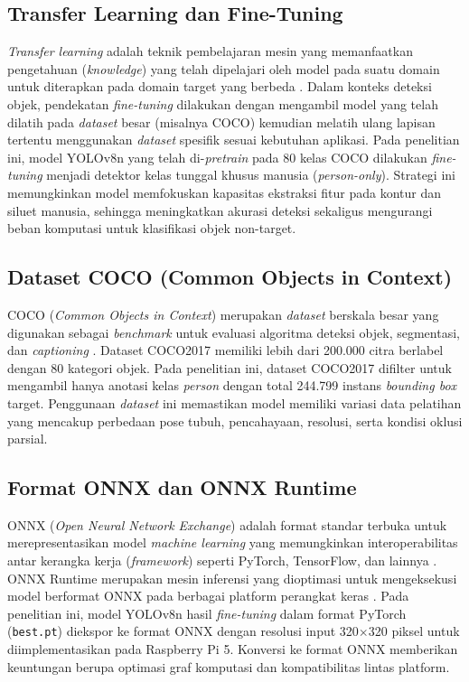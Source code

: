 \subsection{Transfer Learning dan Fine-Tuning}
\textit{Transfer learning} adalah teknik pembelajaran mesin yang memanfaatkan pengetahuan (\textit{knowledge}) yang telah dipelajari oleh model pada suatu domain untuk diterapkan pada domain target yang berbeda \cite{Zhuang2020TransferLearning}. Dalam konteks deteksi objek, pendekatan \textit{fine-tuning} dilakukan dengan mengambil model yang telah dilatih pada \textit{dataset} besar (misalnya COCO) kemudian melatih ulang lapisan tertentu menggunakan \textit{dataset} spesifik sesuai kebutuhan aplikasi. Pada penelitian ini, model YOLOv8n yang telah di-\textit{pretrain} pada 80 kelas COCO dilakukan \textit{fine-tuning} menjadi detektor kelas tunggal khusus manusia (\textit{person-only}). Strategi ini memungkinkan model memfokuskan kapasitas ekstraksi fitur pada kontur dan siluet manusia, sehingga meningkatkan akurasi deteksi sekaligus mengurangi beban komputasi untuk klasifikasi objek non-target.

\subsection{Dataset COCO (Common Objects in Context)}
COCO (\textit{Common Objects in Context}) merupakan \textit{dataset} berskala besar yang digunakan sebagai \textit{benchmark} untuk evaluasi algoritma deteksi objek, segmentasi, dan \textit{captioning} \cite{Lin2014COCO}. Dataset COCO2017 memiliki lebih dari 200.000 citra berlabel dengan 80 kategori objek. Pada penelitian ini, dataset COCO2017 difilter untuk mengambil hanya anotasi kelas \textit{person} dengan total 244.799 instans \textit{bounding box} target. Penggunaan \textit{dataset} ini memastikan model memiliki variasi data pelatihan yang mencakup perbedaan pose tubuh, pencahayaan, resolusi, serta kondisi oklusi parsial.

\subsection{Format ONNX dan ONNX Runtime}
ONNX (\textit{Open Neural Network Exchange}) adalah format standar terbuka untuk merepresentasikan model \textit{machine learning} yang memungkinkan interoperabilitas antar kerangka kerja (\textit{framework}) seperti PyTorch, TensorFlow, dan lainnya \cite{Bai2019ONNX}. ONNX Runtime merupakan mesin inferensi yang dioptimasi untuk mengeksekusi model berformat ONNX pada berbagai platform perangkat keras \cite{ONNXRuntime2019}. Pada penelitian ini, model YOLOv8n hasil \textit{fine-tuning} dalam format PyTorch (\texttt{best.pt}) diekspor ke format ONNX dengan resolusi input 320$\times$320 piksel untuk diimplementasikan pada Raspberry Pi 5. Konversi ke format ONNX memberikan keuntungan berupa optimasi graf komputasi dan kompatibilitas lintas platform.


